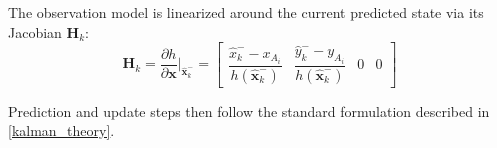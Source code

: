The observation model is linearized around the current predicted state via its Jacobian $\mathbf{H}_k$:
\begin{equation}
\mathbf{H}_k = \frac{\partial h}{\partial \mathbf{x}} \big|_{\hat{\mathbf{x}}_k^-} = 
\begin{bmatrix}
    \dfrac{\hat{x}_k^- - x_{A_i}}{h(\hat{\mathbf{x}}_k^-)} &
    \dfrac{\hat{y}_k^- - y_{A_i}}{h(\hat{\mathbf{x}}_k^-)} &
    0 & 0
\end{bmatrix}
\end{equation}

Prediction and update steps then follow the standard formulation described in \autoref{kalman_theory}.



